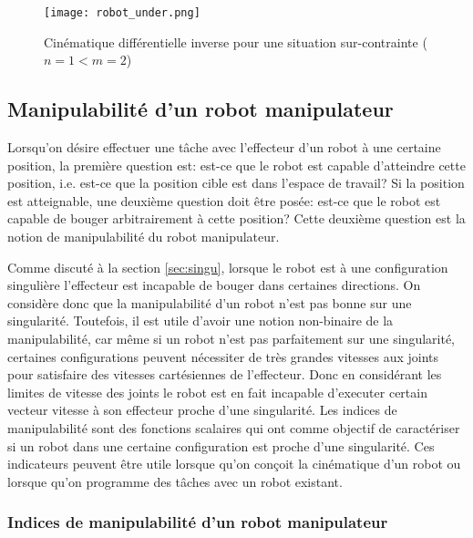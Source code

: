 \begin{example}
\begin{figure}[H]
	\centering
		\texttt{[image: robot\_under.png]}
	\caption{Cinématique différentielle inverse pour une situation sur-contrainte ($n=1<m=2$)}
	\label{fig:robot_under}
\end{figure}
\end{example}


\newpage
\subsection{Manipulabilité d'un robot manipulateur}

Lorsqu'on désire effectuer une tâche avec l'effecteur d'un robot à une certaine position, la première question est: est-ce que le robot est capable d'atteindre cette position, i.e. est-ce que la position cible est dans l'espace de travail? Si la position est atteignable, une deuxième question doit être posée: est-ce que le robot est capable de bouger arbitrairement à cette position? Cette deuxième question est la notion de manipulabilité du robot manipulateur. 

Comme discuté à la section \ref{sec:singu}, lorsque le robot est à une configuration singulière l'effecteur est incapable de bouger dans certaines directions. On considère donc que la manipulabilité d'un robot n'est pas bonne sur une singularité. Toutefois, il est utile d'avoir une notion non-binaire de la manipulabilité, car même si un robot n'est pas parfaitement sur une singularité, certaines configurations peuvent nécessiter de très grandes vitesses aux joints pour satisfaire des vitesses cartésiennes de l'effecteur. Donc en considérant les limites de vitesse des joints le robot est en fait incapable d'executer certain vecteur vitesse à son effecteur proche d'une singularité. Les indices de manipulabilité sont des fonctions scalaires qui ont comme objectif de caractériser si un robot dans une certaine configuration est proche d'une singularité.  Ces indicateurs peuvent être utile lorsque qu'on conçoit la cinématique d'un robot ou lorsque qu'on programme des tâches avec un robot existant.


\subsubsection{Indices de manipulabilité d'un robot manipulateur}

